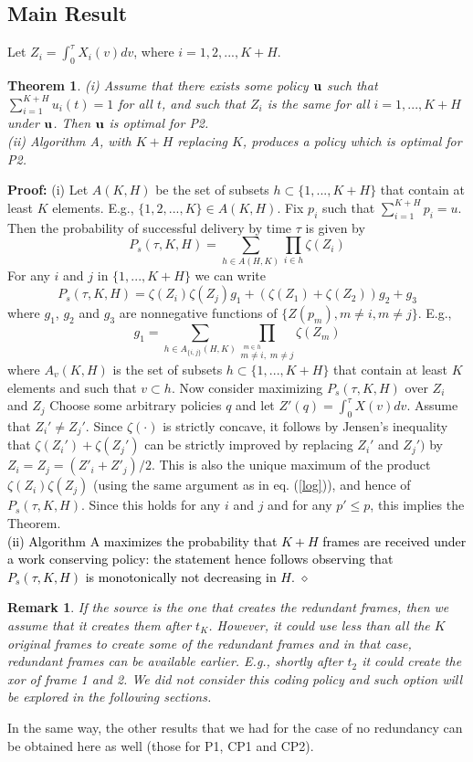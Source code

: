 \documentclass[10pt,twocolumn,conference,final]{IEEEtran}
\def\endpf{\hfill$\diamond$}
\newtheorem{thm}{Theorem}[section]
\newtheorem{remark}{Remark}[section]
\begin{document}
\subsection{Main Result}
Let $ Z_i = \int_0^\tau X_i(v)dv $, where $i=1,2,...,K+H$.
\begin{thm}\label{thmFA}
(i) Assume that there exists some policy ${\bf u}$ such that
$ \sum_{i=1}^{K+H} u_i(t)=1$ for all $t$, and such that
$ Z_i $ is the same for all $i=1,...,K+H$ under
$ {\bf u} $. Then $ {\bf u} $ is optimal for P2.
\\
(ii) Algorithm A, with $K+H$ replacing $K$,
produces a policy which is optimal for P2.
\label{equal2}
\end{thm}
{\bf Proof:}
(i) Let $A(K,H)$ be the set of subsets $h \subset \{ 1,..., K+H \}$
that contain at least $K$ elements.
E.g., $\{1,2,...,K\} \in A(K,H)$.
Fix $p_i$ such that $\sum_{i=1}^{K+H} p_i = u $.
Then the probability of successful delivery by time $\tau$
is given by
\[
P_s ( \tau,K,H ) = \sum_{ h \in A(H,K) } \prod_{i\in h} \zeta (Z_i)
\]
For any $i $ and $j$ in $\{1,...,K+H\}$ we can write
\[
P_s(\tau,K,H) = \zeta ( Z_i ) \zeta ( Z_j ) g_1
+ ( \zeta (Z_1 ) + \zeta (Z_2 ) ) g_2 + g_3
\]
where $g_1$, $g_2$ and $g_3$ are nonnegative
functions of $\{ Z(p_m) , m\not=i, m\not=j \}$.
E.g.,
\[
g_1 =  \sum_{ h \in A_{\{i,j\}} (H,K) } \prod_{
\stackrel{ m\in h }{ m\not=i },\;{ m\not=j}} \zeta (Z_m)
\]
where $A_v(K,H)$ is the set of subsets $h \subset \{ 1,..., K+H \}$
that contain at least $K$ elements and such that $v\subset h$.
Now consider maximizing $P_s(\tau,K,H)$ over $Z_i$ and $Z_j$
Choose some arbitrary policies $q$ and let
$Z'(q) = \int_0^\tau X(v)dv $.
Assume that $Z_i'\not=Z_j'$.
Since $\zeta(\cdot)$ is strictly concave, it follows by Jensen's inequality
that $\zeta (Z_i')+\zeta (Z_j')$ can be strictly improved by replacing
$Z_i'$ and $ Z_j')$ by $Z_i = Z_j = (Z'_i + Z'_j)/2$.
This is also the unique maximum of
the product $\zeta(Z_i)\zeta(Z_j)$
(using the same argument as in eq. (\ref{log})),
and hence of $P_s(\tau,K,H)$.
Since this holds for any $i$ and $j$ and for any $p' \leq p$,
this implies the Theorem.\\
\textcolor{black}{(ii) Algorithm A maximizes the probability that $K+H$ frames are received under a 
work conserving policy: the statement hence follows observing that $P_s(\tau,K,H)$ is 
monotonically not decreasing in $H$.} 
\endpf
\begin{remark}
If the source is the one that creates the redundant frames, then
we assume that it creates them after $t_K$. However, it could use
less than all  the $K$ original frames to create some of the
redundant frames and in that case, redundant frames can be available
earlier.
E.g., shortly after $t_2$ it could create the xor of frame 1 and 2. We did not consider this 
coding policy and such option will be explored in the following sections.
\end{remark}
In the same way, the other results that we had for the case of no redundancy
can be obtained here as well (those for P1, CP1 and CP2).
\end{document}
